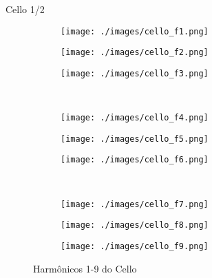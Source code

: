 \documentclass{beamer}
\begin{document}
\begin{frame}{Cello 1/2}
\vspace{-1 cm}
\begin{figure}
  \begin{subfigure}[b]{.15\linewidth}
    \caption*{}
    \texttt{[image: ./images/cello\_f1.png]}
  \end{subfigure}
  \hspace{2 cm}
  \begin{subfigure}[b]{.15\linewidth}
    \caption*{} 
    \texttt{[image: ./images/cello\_f2.png]}
  \end{subfigure}
\hspace{2 cm}
  \begin{subfigure}[b]{.15\linewidth}
    \caption*{} 
    \texttt{[image: ./images/cello\_f3.png]}
  \end{subfigure}  
  \\ \vspace{-0.5 cm}
  \begin{subfigure}[b]{.15\linewidth}
    \caption*{}
    \texttt{[image: ./images/cello\_f4.png]}
  \end{subfigure}
  \hspace{2 cm}
  \begin{subfigure}[b]{.15\linewidth}
    \caption*{} 
    \texttt{[image: ./images/cello\_f5.png]}
  \end{subfigure}
\hspace{2 cm}
  \begin{subfigure}[b]{.15\linewidth}
    \caption*{} 
    \texttt{[image: ./images/cello\_f6.png]}
  \end{subfigure}  
\\ \vspace{-0.5 cm}
  \begin{subfigure}[b]{.15\linewidth}
    \caption*{}
    \texttt{[image: ./images/cello\_f7.png]}
  \end{subfigure}
  \hspace{2 cm}
  \begin{subfigure}[b]{.15\linewidth}
    \caption*{} 
    \texttt{[image: ./images/cello\_f8.png]}
  \end{subfigure}
\hspace{2 cm}
  \begin{subfigure}[b]{.15\linewidth}
    \caption*{} 
    \texttt{[image: ./images/cello\_f9.png]}
  \end{subfigure}  
\caption{Harmônicos 1-9 do Cello}
\end{figure}
\end{frame}
\end{document}
